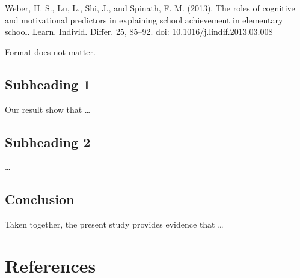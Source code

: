 \documentclass[
  man]{apa6}
\begin{document}
Weber, H. S., Lu, L., Shi, J., and Spinath, F. M. (2013). The roles of cognitive and motivational predictors in explaining school achievement in elementary school. Learn. Individ. Differ. 25, 85--92. doi: 10.1016/j.lindif.2013.03.008

Format does not matter.

\hypertarget{subheading-1}{%
\subsection{Subheading 1}\label{subheading-1}}

Our result show that \ldots{}

\hypertarget{subheading-2}{%
\subsection{Subheading 2}\label{subheading-2}}

\ldots{}

\hypertarget{conclusion}{%
\subsection{Conclusion}\label{conclusion}}

Taken together, the present study provides evidence that \ldots{}

\newpage

\hypertarget{references}{%
\section{References}\label{references}}

\begingroup
\setlength{\parindent}{-0.5in}
\setlength{\leftskip}{0.5in}
\end{document}
